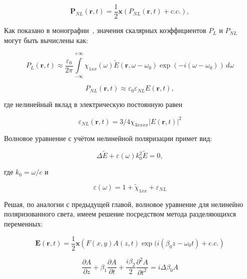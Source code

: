 \begin{equation}
	\mathbf{P}_{NL}(\mathbf{r}, t) = \frac{1}{2}\mathbf{x}\left( P_{NL}(\mathbf{r}, t) + \text{c.c.} \right),
\end{equation}

Как показано в монографии~\cite{agrawal2007nonlinear}, значения скалярных коэффициентов $P_L$ и $P_{NL}$ могут быть вычислены как:

\begin{equation}
	P_L(\mathbf{r}, t) \approx \frac{\varepsilon_0}{2\pi} \int \limits_{-\infty}^{+\infty} \chi_{1xx}(\omega) \widetilde{E}(\mathbf{r}, \omega - \omega_0) \exp{\left( -i(\omega - \omega_0) \right)} \, d\omega
\end{equation}

\begin{equation}
	P_{NL}(\mathbf{r}, t) \approx \varepsilon_0 \varepsilon_{NL} E(\mathbf{r}, t),
\end{equation}

где нелинейный вклад в электрическую постоянную равен

\begin{equation}
	\varepsilon_{NL}(\mathbf{r}, t) = 3/4 \chi_{3xxxx} \left| E(\mathbf{r}, t) \right|^2
\end{equation}

Волновое уравнение с учётом нелинейной поляризации примет вид:

\begin{equation}
	\Delta \widetilde{E} + \varepsilon(\omega) k_0^2 \widetilde{E} = 0,
\end{equation}

где $k_0 = \omega / c$ и

\begin{equation}
	\varepsilon(\omega) = 1 + \widetilde{\chi}_{1xx} + \varepsilon_{NL}
\end{equation}

Решая, по аналогии с предыдущей главой, волновое уравнение для нелинейно поляризованного света, имеем решение посредством метода разделяющихся переменных:

\begin{equation}
	\mathbf{E}(\mathbf{r}, t) = \frac{1}{2}\mathbf{x}\left( F(x, y) A(z, t) \exp{(i(\beta_0z - \omega_0t)} + \text{c.c.} \right)
\end{equation}

\begin{equation}
	\frac{\partial A}{\partial z} + \beta_1 \frac{\partial A}{\partial t} + \frac{i \beta_2}{2} \frac{\partial^2 A}{\partial t^2} = i \Delta \beta_0 A
\end{equation}


